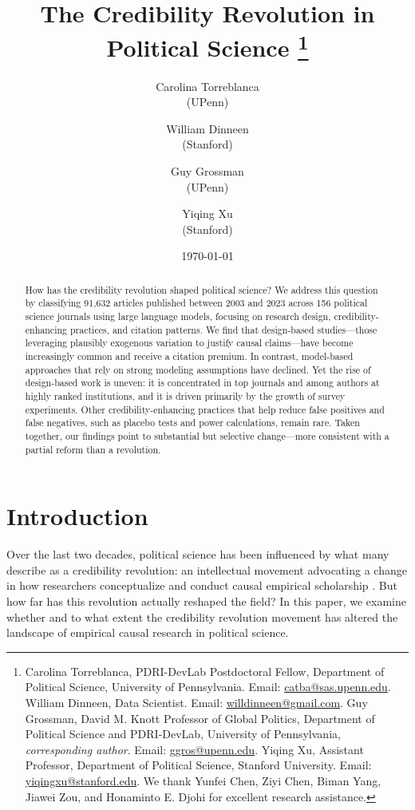 \documentclass[12pt]{article}
\title{\bf The Credibility Revolution in Political Science
\thanks{\small Carolina Torreblanca, PDRI-DevLab Postdoctoral Fellow, Department of Political Science, University of Pennsylvania. Email: \href{mailto:catba@sas.upenn.edu}{catba@sas.upenn.edu}.  William Dinneen, Data Scientist. Email: \href{mailto:willdinneen@gmail.com}{willdinneen@gmail.com}. Guy Grossman, David M. Knott Professor of Global Politics, Department of Political Science and PDRI-DevLab, University of Pennsylvania, \emph{corresponding author}. Email: \href{mailto:ggros@upenn.edu}{ggros@upenn.edu}. Yiqing Xu, Assistant Professor, Department of Political Science, Stanford University. Email: \href{mailto:yiqingxu@stanford.edu}{yiqingxu@stanford.edu}. We thank Yunfei Chen, Ziyi Chen, Biman Yang, Jiawei Zou, and Honaminto E. Djohi for excellent research assistance.}}
\author{Carolina Torreblanca\\(UPenn) \and William Dinneen\\(Stanford) \and Guy Grossman\\(UPenn) \and  Yiqing Xu\\(Stanford)}
\date{\bigskip\today}
\begin{document}
  \maketitle
\thispagestyle{empty}
\vspace{-2em}\begin{abstract}
\noindent How has the credibility revolution shaped political science? We address this question by classifying 91,632 articles published between 2003 and 2023 across 156 political science journals using large language models, focusing on research design, credibility-enhancing practices, and citation patterns. We find that design-based studies—those leveraging plausibly exogenous variation to justify causal claims—have become increasingly common and receive a citation premium. In contrast, model-based approaches that rely on strong modeling assumptions have declined. Yet the rise of design-based work is uneven: it is concentrated in top journals and among authors at highly ranked institutions, and it is driven primarily by the growth of survey experiments. Other credibility-enhancing practices that help reduce false positives and false negatives, such as placebo tests and power calculations, remain rare. Taken together, our findings point to substantial but selective change—more consistent with a partial reform than a revolution.
\end{abstract}

\newpage
{}
\setcounter{page}{1}

\section*{Introduction}\label{sec:intro}

Over the last two decades, political science has been influenced by what many describe as a credibility revolution: an intellectual movement advocating a change in how researchers conceptualize and conduct causal empirical scholarship \citep{angrist2010credibility, dunning2012natural, gerber2012field, morgan2014counterfactuals, samii2016, aronow2019foundations, blair2023research, SloughTyson2024, imbens2025comparing}. But how far has this revolution actually reshaped the field? In this paper, we examine whether and to what extent the credibility revolution movement has altered the landscape of empirical causal research in political science. 
\end{document}
